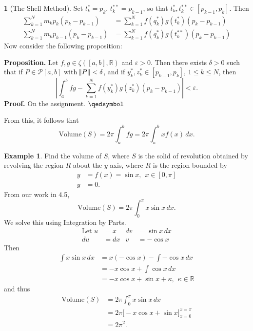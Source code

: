 \documentclass[11pt]{article}
\theoremstyle{definition}
\newtheorem{exmp}[thm]{Example}
\newtheorem{none}[thm]{}
\newcommand{\mbR}{\ensuremath{\mathbb{R}}}
\begin{document}
\begin{none}[The Shell Method]
Set $t_k^* = p_k$, $t_k^{**} = p_{k-1}$, so that $t_k^*, t_k^{**} \in [p_{k-1}, p_k]$. Then
\begin{align*}
\sum_{k=1}^N m_kp_k(p_k-p_{k-1}) & = \sum_{k=1}^N f(q_k^*)g(t_k^*)(p_k - p_{k-1}) \\
\sum_{k=1}^N m_kp_{k-1}(p_k-p_{k-1}) & = \sum_{k=1}^N f(q_k^*)g(t_k^{**})(p_k - p_{k-1})
\end{align*}
Now consider the following proposition: 

\textbf{Proposition.} Let $f, g \in \zeta([a, b], \mbR)$ and $\varepsilon > 0$. Then there exists $\delta > 0$ such that if $P \in \mathcal{P}[a, b]$ with $\norm{P} < \delta$, and if $y_k^*, z_k^* \in [p_{k-1}, p_k]$, $1 \leq k \leq N$, then
$$\left|\int_a^b fg - \sum_{k=1}^N f(y_k^*)g(z_k^*)(p_k - p_{k-1})\right| < \varepsilon \text{.}$$
\textbf{Proof.} On the assignment. $\qedsymbol$ 

From this, it follows that
$$\text{Volume}(S) = 2\pi\int_a^b fg = 2\pi\int_a^b xf(x) \hspace{2pt}dx \text{.}$$
\end{none}

\begin{exmp} Find the volume of $S$, where $S$ is the solid of revolution obtained by revolving the region $R$ about the $y$-axis, where $R$ is the region bounded by
\begin{align*} y & = f(x) = \sin x, \hspace{5pt} x \in [0, \pi] \\ y & = 0 \text{.} \end{align*}
From our work in 4.5,
$$\text{Volume}(S) = 2\pi\int_0^\pi x\sin x \hspace{2pt}dx \text{.}$$
We solve this using Integration by Parts. 
\[ \begin{aligned}
\text{Let } u & = x & dv & = \sin x \hspace{2pt}dx \\
du & = dx & v & = -\cos x
\end{aligned} \]
Then
\begin{align*}
\int x \sin x \hspace{2pt}dx
& = x(-\cos x) - \int -\cos x \hspace{2pt}dx \\
& = -x\cos x + \int \cos x \hspace{2pt}dx \\
& = -x\cos x + \sin x + \kappa, \hspace{5pt} \kappa \in \mbR 
\end{align*}
and thus
\begin{align*}
\text{Volume}(S)
& = 2\pi\int_0^\pi x \sin x \hspace{2pt}dx \\
& = 2\pi \biggr[-x\cos x + \sin x\biggr]_{x=0}^{x=\pi} \\
& = 2\pi^2 \text{.}
\end{align*}
\end{exmp}
\end{document}

